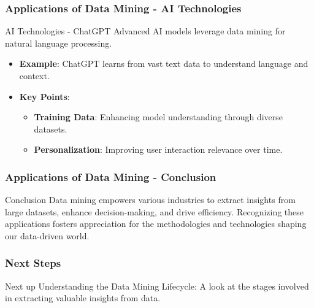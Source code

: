 \documentclass[aspectratio=169]{beamer}
\begin{document}
\begin{frame}[fragile]
    \frametitle{Applications of Data Mining - AI Technologies}
    \begin{block}{AI Technologies - ChatGPT}
        Advanced AI models leverage data mining for natural language processing.
    \end{block}
    \begin{itemize}
        \item \textbf{Example}: ChatGPT learns from vast text data to understand language and context.
        \item \textbf{Key Points}:
            \begin{itemize}
                \item \textbf{Training Data}: Enhancing model understanding through diverse datasets.
                \item \textbf{Personalization}: Improving user interaction relevance over time.
            \end{itemize}
    \end{itemize}
\end{frame}

\begin{frame}[fragile]
    \frametitle{Applications of Data Mining - Conclusion}
    \begin{block}{Conclusion}
        Data mining empowers various industries to extract insights from large datasets, enhance decision-making, and drive efficiency. Recognizing these applications fosters appreciation for the methodologies and technologies shaping our data-driven world.
    \end{block}
\end{frame}

\begin{frame}[fragile]
    \frametitle{Next Steps}
    \begin{block}{Next up}
        Understanding the Data Mining Lifecycle: A look at the stages involved in extracting valuable insights from data.
    \end{block}
\end{frame}
\end{document}
